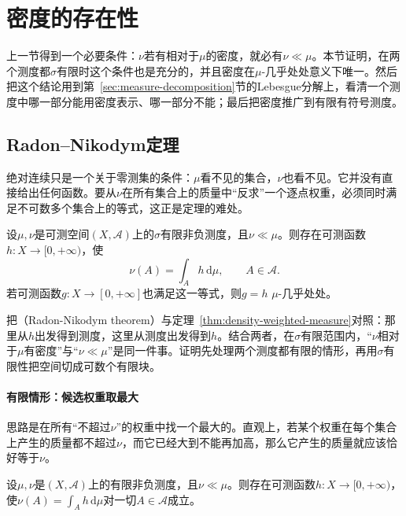 \section{密度的存在性}
\label{sec:density-existence}

上一节得到一个必要条件：$\nu$若有相对于$\mu$的密度，就必有$\nu\ll\mu$。本节证明，在两个测度都$\sigma$有限时这个条件也是充分的，并且密度在$\mu$-几乎处处意义下唯一。然后把这个结论用到第~\ref{sec:measure-decomposition}节的Lebesgue分解上，看清一个测度中哪一部分能用密度表示、哪一部分不能；最后把密度推广到有限有符号测度。

\subsection{Radon–Nikodym定理}
\label{sec:density-radon-nikodym}

绝对连续只是一个关于零测集的条件：$\mu$看不见的集合，$\nu$也看不见。它并没有直接给出任何函数。要从$\nu$在所有集合上的质量中“反求”一个逐点权重，必须同时满足不可数多个集合上的等式，这正是定理的难处。

\begin{theorem}
\label{thm:density-radon-nikodym}
设$\mu,\nu$是可测空间$(X,\mathcal A)$上的$\sigma$有限非负测度，且$\nu\ll\mu$。则存在可测函数$h:X\to[0,+\infty)$，使
\[
 \nu(A)=\int_Ah\,\mathrm d\mu,\qquad A\in\mathcal A .
\]
若可测函数$g:X\to[0,+\infty]$也满足这一等式，则$g=h$ $\mu$-几乎处处。
\end{theorem}

把（Radon-Nikodym theorem）与定理~\ref{thm:density-weighted-measure}对照：那里从$h$出发得到测度，这里从测度出发得到$h$。结合两者，在$\sigma$有限范围内，“$\nu$相对于$\mu$有密度”与“$\nu\ll\mu$”是同一件事。证明先处理两个测度都有限的情形，再用$\sigma$有限性把空间切成可数个有限块。

\paragraph{有限情形：候选权重取最大}
思路是在所有“不超过$\nu$”的权重中找一个最大的。直观上，若某个权重在每个集合上产生的质量都不超过$\nu$，而它已经大到不能再加高，那么它产生的质量就应该恰好等于$\nu$。

\begin{lemma}[有限测度的密度存在]
\label{lem:density-rn-finite}
设$\mu,\nu$是$(X,\mathcal A)$上的有限非负测度，且$\nu\ll\mu$。则存在可测函数$h:X\to[0,+\infty)$，使$\nu(A)=\int_Ah\,\mathrm d\mu$对一切$A\in\mathcal A$成立。
\end{lemma}

